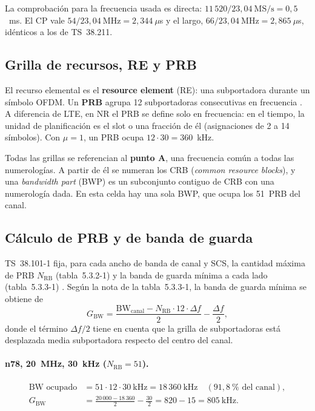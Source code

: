 La comprobación para la frecuencia usada es directa: $11\,520 / 23{,}04~\text{MS/s} = 0{,}5$~ms. El CP vale $54/23{,}04~\text{MHz} = 2{,}344~\mu$s y el largo, $66/23{,}04~\text{MHz} = 2{,}865~\mu$s, idénticos a los de TS~38.211.

\subsection{Grilla de recursos, RE y PRB}
El recurso elemental es el \textbf{resource element} (RE): una subportadora durante un símbolo OFDM. Un \textbf{PRB} agrupa 12 subportadoras consecutivas en frecuencia \cite[§4.4]{ts38211}. A diferencia de LTE, en NR el PRB se define solo en frecuencia: en el tiempo, la unidad de planificación es el slot o una fracción de él (asignaciones de 2 a 14 símbolos). Con $\mu=1$, un PRB ocupa $12\cdot 30 = 360$~kHz.

Todas las grillas se referencian al \textbf{punto A}, una frecuencia común a todas las numerologías. A partir de él se numeran los CRB (\emph{common resource blocks}), y una \emph{bandwidth part} (BWP) es un subconjunto contiguo de CRB con una numerología dada. En esta celda hay una sola BWP, que ocupa los 51~PRB del canal.

\subsection{Cálculo de PRB y de banda de guarda}\label{sec:guarda}
TS~38.101-1 fija, para cada ancho de banda de canal y SCS, la cantidad máxima de PRB $N_\text{RB}$ (tabla~5.3.2-1) y la banda de guarda mínima a cada lado (tabla~5.3.3-1) \cite[§5.3.2 y §5.3.3]{ts38101}. Según la nota de la tabla~5.3.3-1, la banda de guarda mínima se obtiene de
\begin{equation}
G_\text{BW} = \frac{\text{BW}_\text{canal} - N_\text{RB}\cdot 12\cdot\Delta f}{2} - \frac{\Delta f}{2},
\label{eq:guarda}
\end{equation}
donde el término $\Delta f/2$ tiene en cuenta que la grilla de subportadoras está desplazada media subportadora respecto del centro del canal.

\paragraph{n78, 20~MHz, 30~kHz ($N_\text{RB}=51$).}
\begin{align}
\text{BW ocupado} &= 51\cdot 12\cdot 30~\text{kHz} = 18\,360~\text{kHz} \quad (91{,}8~\%\text{ del canal}),\\
G_\text{BW} &= \frac{20\,000-18\,360}{2} - \frac{30}{2} = 820 - 15 = 805~\text{kHz}.
\end{align}

